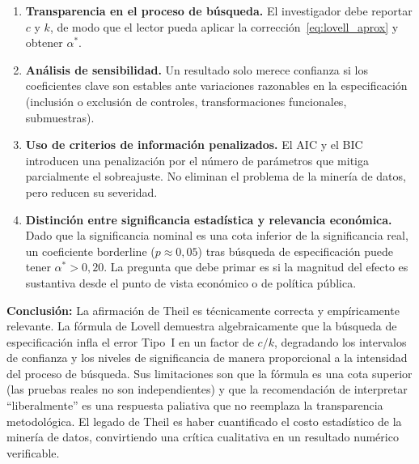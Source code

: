\documentclass[12pt, letterpaper]{article}
\begin{document}
\begin{enumerate}[leftmargin=1.8cm, label=\textbf{P\arabic*.}]

  \item \textbf{Transparencia en el proceso de búsqueda.} El investigador
    debe reportar $c$ y $k$, de modo que el lector pueda aplicar
    la corrección~\eqref{eq:lovell_aprox} y obtener $\alpha^*$.

  \item \textbf{Análisis de sensibilidad.} Un resultado solo merece
    confianza si los coeficientes clave son estables ante variaciones
    razonables en la especificación (inclusión o exclusión de controles,
    transformaciones funcionales, submuestras).

  \item \textbf{Uso de criterios de información penalizados.} El AIC y
    el BIC introducen una penalización por el número de parámetros que
    mitiga parcialmente el sobreajuste. No eliminan el problema de la
    minería de datos, pero reducen su severidad.

  \item \textbf{Distinción entre significancia estadística y relevancia
    económica.} Dado que la significancia nominal es una cota inferior
    de la significancia real, un coeficiente borderline ($p \approx 0{,}05$)
    tras búsqueda de especificación puede tener $\alpha^* > 0{,}20$.
    La pregunta que debe primar es si la magnitud del efecto es
    sustantiva desde el punto de vista económico o de política pública.

\end{enumerate}

\begin{clave}
  \textbf{Conclusión:} La afirmación de Theil es técnicamente correcta y
  empíricamente relevante. La fórmula de Lovell demuestra algebraicamente
  que la búsqueda de especificación infla el error Tipo~I en un factor de
  $c/k$, degradando los intervalos de confianza y los niveles de
  significancia de manera proporcional a la intensidad del proceso de
  búsqueda. Sus limitaciones son que la fórmula es una cota superior
  (las pruebas reales no son independientes) y que la recomendación
  de interpretar ``liberalmente'' es una respuesta paliativa que no
  reemplaza la transparencia metodológica. El legado de Theil es haber
  cuantificado el costo estadístico de la minería de datos, convirtiendo
  una crítica cualitativa en un resultado numérico verificable.
\end{clave}
\end{document}
